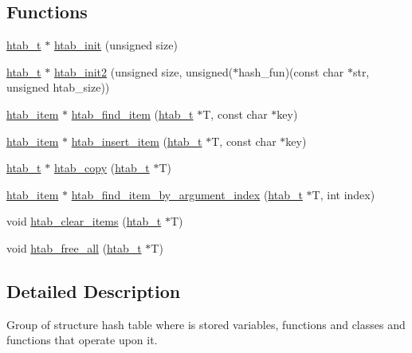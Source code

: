 \subsection*{Functions}
\begin{DoxyCompactItemize}
\item 
\hyperlink{structhtab__t}{htab\+\_\+t} $\ast$ \hyperlink{group__hash__table_ga8da41f55d0119f728e29790644c76273}{htab\+\_\+init} (unsigned size)
\item 
\hyperlink{structhtab__t}{htab\+\_\+t} $\ast$ \hyperlink{group__hash__table_gaf815621effc0000f6111efd83658bc5d}{htab\+\_\+init2} (unsigned size, unsigned($\ast$hash\+\_\+fun)(const char $\ast$str, unsigned htab\+\_\+size))
\item 
\hyperlink{structhtab__item}{htab\+\_\+item} $\ast$ \hyperlink{group__hash__table_ga077c62e3e81dc1d8b3a540abe174deb6}{htab\+\_\+find\+\_\+item} (\hyperlink{structhtab__t}{htab\+\_\+t} $\ast$T, const char $\ast$key)
\item 
\hyperlink{structhtab__item}{htab\+\_\+item} $\ast$ \hyperlink{group__hash__table_ga33dbf85315f98499118a1ac26341bd1c}{htab\+\_\+insert\+\_\+item} (\hyperlink{structhtab__t}{htab\+\_\+t} $\ast$T, const char $\ast$key)
\item 
\hyperlink{structhtab__t}{htab\+\_\+t} $\ast$ \hyperlink{group__hash__table_gac7de0e31e2b7c6ed20a6862fefac6ae7}{htab\+\_\+copy} (\hyperlink{structhtab__t}{htab\+\_\+t} $\ast$T)
\item 
\hyperlink{structhtab__item}{htab\+\_\+item} $\ast$ \hyperlink{group__hash__table_ga37f3431054129d2eb752bdf3c95fefbb}{htab\+\_\+find\+\_\+item\+\_\+by\+\_\+argument\+\_\+index} (\hyperlink{structhtab__t}{htab\+\_\+t} $\ast$T, int index)
\item 
void \hyperlink{group__hash__table_gaa52a7f716d200f95dfb312cabb564974}{htab\+\_\+clear\+\_\+items} (\hyperlink{structhtab__t}{htab\+\_\+t} $\ast$T)
\item 
void \hyperlink{group__hash__table_gac185c139894f62be94926388b7173627}{htab\+\_\+free\+\_\+all} (\hyperlink{structhtab__t}{htab\+\_\+t} $\ast$T)
\end{DoxyCompactItemize}


\subsection{Detailed Description}
Group of structure hash table where is stored variables, functions and classes and functions that operate upon it. 



